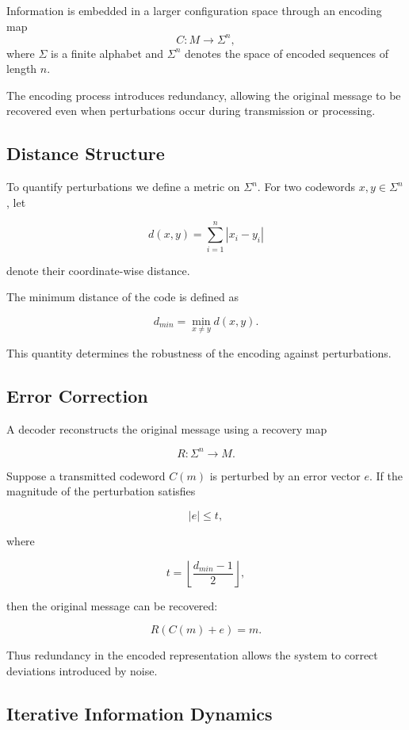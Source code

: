 \documentclass[12pt]{article}
\begin{document}
Information is embedded in a larger configuration space through an encoding map
\[
C : M \rightarrow \Sigma^n ,
\]
where $\Sigma$ is a finite alphabet and $\Sigma^n$ denotes the space of encoded sequences of length $n$.

The encoding process introduces redundancy, allowing the original message to be recovered even when perturbations occur during transmission or processing.

\subsection{Distance Structure}

To quantify perturbations we define a metric on $\Sigma^n$. For two codewords $x,y \in \Sigma^n$, let

\[
d(x,y) = \sum_{i=1}^{n} |x_i - y_i|
\]

denote their coordinate-wise distance.

The minimum distance of the code is defined as

\[
d_{min} = \min_{x \neq y} d(x,y) .
\]

This quantity determines the robustness of the encoding against perturbations.

\subsection{Error Correction}

A decoder reconstructs the original message using a recovery map

\[
R : \Sigma^n \rightarrow M .
\]

Suppose a transmitted codeword $C(m)$ is perturbed by an error vector $e$. If the magnitude of the perturbation satisfies

\[
|e| \le t ,
\]

where

\[
t = \left\lfloor \frac{d_{min}-1}{2} \right\rfloor ,
\]

then the original message can be recovered:

\[
R(C(m) + e) = m .
\]

Thus redundancy in the encoded representation allows the system to correct deviations introduced by noise.

\subsection{Iterative Information Dynamics}
\end{document}
